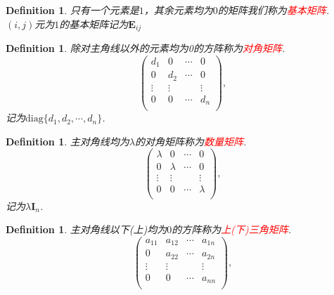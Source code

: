 \documentclass{article}
\newtheorem{definition}[theorem]{Definition}
\newcommand{\mbf}[1]{\bm{#1}}
\newcommand{\redt}[1]{\textcolor{red}{#1}}
\begin{document}
\begin{definition}
\rm 只有一个元素是$1$，其余元素均为$0$的矩阵我们称为\redt{基本矩阵}. $(i,j)$元为$1$的基本矩阵记为$\mbf{E}_{ij}$
\end{definition}

\begin{definition}
\rm 除对主角线以外的元素均为0的方阵称为\redt{对角矩阵}.
$$
\begin{pmatrix}
d_1 & 0 & \cdots & 0 \\
0 & d_2 & \cdots & 0 \\
\vdots & \vdots & & \vdots \\
0 & 0 &\cdots & d_n \\
\end{pmatrix},
$$
记为$\text{diag}\{d_1,d_2,\cdots,d_n\}$.
\end{definition}

\begin{definition}
\rm 主对角线均为$\lambda$的对角矩阵称为\redt{数量矩阵}.
$$
\begin{pmatrix}
\lambda & 0 & \cdots & 0 \\
0 & \lambda & \cdots & 0 \\
\vdots & \vdots & & \vdots \\
0 & 0 &\cdots & \lambda \\
\end{pmatrix},
$$
记为$\lambda \mbf{I}_{n}$.
\end{definition}

\begin{definition}
\rm  主对角线以下(上)均为$0$的方阵称为\redt{上(下)三角矩阵}. 
$$
\begin{pmatrix}
a_{11} & a_{12} & \cdots & a_{1n} \\
0 & a_{22} & \cdots & a_{2n} \\
\vdots & \vdots & & \vdots \\
0 & 0 &\cdots & a_{nn} \\
\end{pmatrix},
$$
\end{definition}
\end{document}
